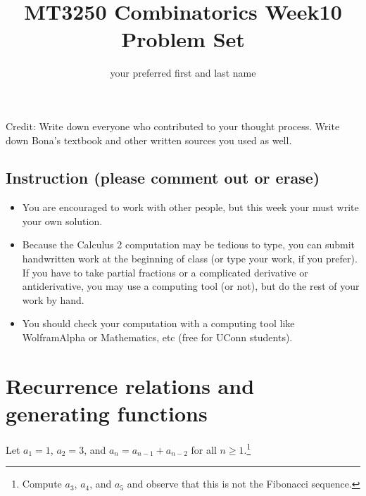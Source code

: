 \documentclass[12pt]{amsart}
\title{MT3250 Combinatorics Week10 Problem Set}
\author{your preferred first and last name}
\date{}
\begin{document}
\maketitle


\noindent Credit: 
Write down everyone who contributed to your thought process. Write down Bona's textbook and other written sources you used as well.

\subsection*{Instruction (please comment out or erase)} 
\begin{itemize}
\item %
You are encouraged to work with other people, but this week your must write your own solution. 

\item 
Because the Calculus 2 computation may be tedious to type, you can submit handwritten work at the beginning of class (or type your work, if you prefer). 
If you have to take partial fractions or a complicated derivative or antiderivative, 
you may use a computing tool (or not), but do the rest of your work by hand. 

\item You should check your computation with a computing tool like WolframAlpha or Mathematics, etc (free for UConn students). 
\end{itemize}

\bigskip 


\section{%
Recurrence relations and generating functions}
Let $a_1=1$, $a_2=3$, and $a_n=a_{n-1} + a_{n-2}$ for all $n \geq 1$.\footnote{Compute $a_3$, $a_4$, and $a_5$ and observe that this is not the Fibonacci sequence.}
\end{document}
